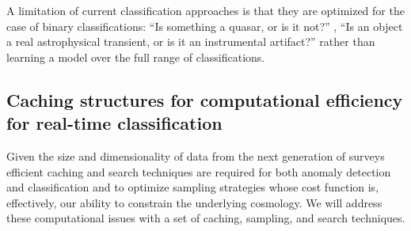 \documentclass[prd,nofootbib,floatfix,11pt,tightenlines]{revtex4}
\begin{document}
A limitation of current classification approaches is that they are 
optimized for the case of binary classifications: ``Is something a 
quasar, or is it not?''  \cite{kim2011,pichara2012}, ``Is an 
object a real astrophysical transient, or is it an instrumental 
artifact?''  \cite{brink2012} rather than learning a model over the 
full range of classifications. 



%

\subsection{Caching structures for computational efficiency for
  real-time classification}
\label{sec:computationalefficiency}

Given the size and dimensionality of data from the next generation of
surveys efficient caching and search techniques are required for both
anomaly detection and classification and to optimize sampling
strategies whose cost function is, effectively, our ability to
constrain the underlying cosmology. We will address these
computational issues with a set of caching, sampling, and search
techniques.

\end{document}
